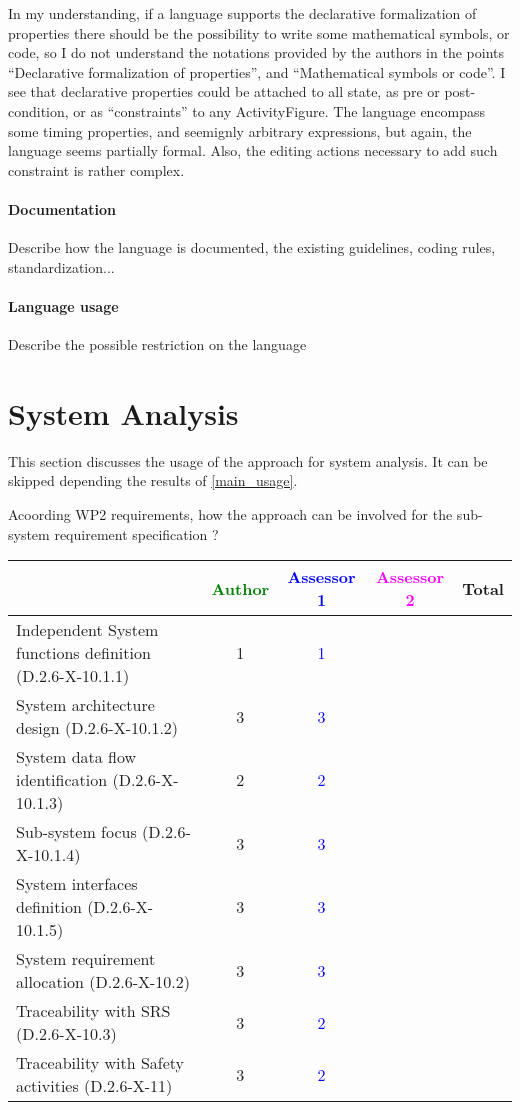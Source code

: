\begin{assessor1}
In my understanding, if a language supports the declarative formalization of properties there should be the possibility to write some mathematical symbols, or code, so I do not understand the notations provided by the authors in the points
"`Declarative formalization of properties"', and "`Mathematical symbols or code"'. I see that declarative properties could be attached to all state, as pre or post-condition, or as "`constraints"' to any ActivityFigure. The language encompass some timing properties, and seemignly arbitrary expressions, but again, the language seems partially formal. Also, the editing actions necessary to add such constraint is rather complex. 
\end{assessor1}

\paragraph{Documentation} Describe how the language is documented, the existing guidelines, coding rules, standardization...

\paragraph{Language usage} Describe the possible restriction on the language

\section{System Analysis}
This section discusses the usage of the approach for system analysis.
It can be skipped depending the results of \ref{main_usage}.

Acoording WP2 requirements, how the approach can be involved for the sub-system requirement specification ?

\begin{tabular}{|l | c | c | c | c|}
\hline
& \textcolor{green}{Author} & \textcolor{blue}{Assessor 1} & \textcolor{magenta}{Assessor 2} & Total \\
\hline
Independent System functions definition (D.2.6-X-10.1.1) & 1 & \textcolor{blue}{1} & & \\
\hline
System architecture design (D.2.6-X-10.1.2) & 3 & \textcolor{blue}{3} & & \\
\hline
System data flow identification (D.2.6-X-10.1.3) & 2 & \textcolor{blue}{2} & & \\
\hline
Sub-system focus (D.2.6-X-10.1.4) & 3 & \textcolor{blue}{3} & & \\
\hline
System interfaces definition (D.2.6-X-10.1.5) & 3 & \textcolor{blue}{3} & & \\
\hline
System requirement allocation (D.2.6-X-10.2) & 3 & \textcolor{blue}{3} & & \\
\hline
Traceability with SRS (D.2.6-X-10.3) & 3 & \textcolor{blue}{2} & & \\
\hline
Traceability with Safety activities (D.2.6-X-11) & 3 & \textcolor{blue}{2} & & \\
\hline
\end{tabular}


